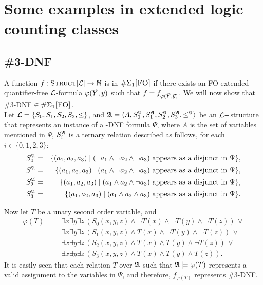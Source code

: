 \section{Some examples in extended logic counting classes}

\subsection{{\sc \#3-DNF}}
A function $f:\textsc{Struct}[{\cal L}] \to \mathbb{N}$ is in $\#\Sigma_1\textsc{[FO]}$ if there exists an {\sc FO}-extended quantifier-free ${\cal L}$-formula $\varphi(\vec{Y},\vec{y})$ such that $f = f_{\varphi(\vec{Y},\vec{y})}$. We will now show that {\sc \#3-DNF} $\in\#\Sigma_1\textsc{[FO]}$.\\

Let ${\cal L} = \{S_0,S_1,S_2,S_3,\leq\}$, and ${\frak A} = \langle A, S_0^{\frak A}, S_1^{\frak A}, S_2^{\frak A}, S_3^{\frak A}, \leq^{\frak A} \rangle$ be an ${\cal L}-$structure that represents an instance of a {-DNF} formula $\Psi$, where $A$ is the set of variables mentioned in $\Psi$, $S_i^{\frak A}$ is a ternary relation described as follows, for each $i\in\{0,1,2,3\}$:
\begin{eqnarray*}
S_0^{\frak A} &=& \{(a_1,a_2,a_3)\mid (\neg a_1 \wedge \neg a_2 \wedge \neg a_3) \mbox{ appears as a disjunct in }\Psi\},\\
S_1^{\frak A} &=& \{(a_1,a_2,a_3)\mid ( a_1 \wedge \neg a_2 \wedge \neg a_3) \mbox{ appears as a disjunct in }\Psi\},\\
S_2^{\frak A} &=& \{(a_1,a_2,a_3)\mid ( a_1 \wedge  a_2 \wedge \neg a_3) \mbox{ appears as a disjunct in }\Psi\},\\
S_3^{\frak A} &=& \{(a_1,a_2,a_3)\mid ( a_1 \wedge  a_2 \wedge  a_3) \mbox{ appears as a disjunct in }\Psi\}.
\end{eqnarray*}

Now let $T$ be a unary second order variable, and
\begin{align*}
\varphi(T) =\ &\exists x \exists y \exists z \,(S_0(x,y,z) \wedge \neg T(x) \wedge \neg T(y) \wedge \neg T(z))\,\vee \\
&\exists x \exists y \exists z \,(S_1(x,y,z) \wedge T(x) \wedge \neg T(y) \wedge \neg T(z))\,\vee \\
&\exists x \exists y \exists z \,(S_2(x,y,z) \wedge T(x) \wedge T(y) \wedge \neg T(z))\,\vee \\
&\exists x \exists y \exists z \,(S_3(x,y,z) \wedge T(x) \wedge T(y) \wedge T(z)).
\end{align*}
It is easily seen that each relation $T$ over ${\frak A}$ such that ${\frak A}\models\varphi(T)$ represents a valid assignment to the variables in $\Psi$, and therefore, $f_{\varphi(T)}$ represents {\sc \#3-DNF}.

